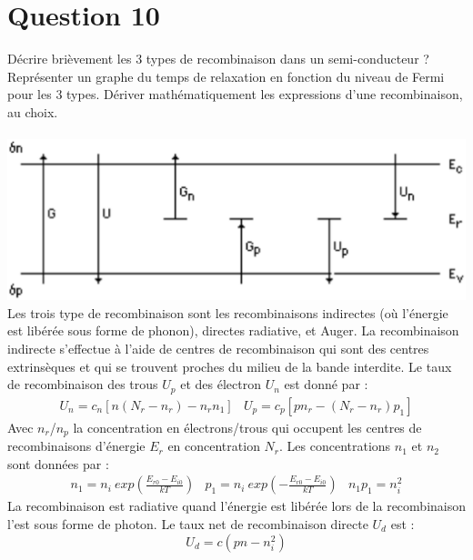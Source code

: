 \section{Question 10}
Décrire brièvement les 3 types de recombinaison dans un semi-conducteur ? Représenter
un graphe du temps de relaxation en fonction du niveau de Fermi pour les 3 types. Dériver mathématiquement les expressions d'une recombinaison, au choix.
\\
\hbox{}
\\
\includegraphics[scale=0.3]{band.eps} \\
Les trois type de recombinaison sont les recombinaisons indirectes (où l'énergie est libérée sous forme de phonon), directes radiative, et Auger. La recombinaison indirecte s'effectue à l'aide de centres de recombinaison qui sont des centres extrinsèques et qui se trouvent proches du milieu de la bande interdite. 
Le taux de recombinaison des trous $U_p$ et des électron $U_n$ est donné par :
\begin{equation}
\begin{array}{cc}
U_n=c_n[n(N_r-n_r)-n_rn_1] & U_p=c_p[pn_r-(N_r-n_r)p_1] 
\end{array} 
\end{equation}
Avec $n_r$/$n_p$ la concentration en électrons/trous qui occupent les centres de recombinaisons d'énergie $E_r$ en concentration $N_r$. Les concentrations $n_1$ et $n_2$ sont données par :
\begin{equation}
\begin{array}{ccc}
n_1=n_i ~exp\left(\frac{E_{r0}-E_{i0}}{kT}\right) & p_1=n_i ~exp\left(-\frac{E_{r0}-E_{i0}}{kT}\right) & n_1p_1=n_i^2
\end{array} 
\end{equation}
La recombinaison est radiative quand l'énergie est libérée lors de la recombinaison l'est sous forme de photon. Le taux net de recombinaison directe $U_d$ est :
\begin{equation}
U_d=c(pn-n_i^2)
\end{equation}
